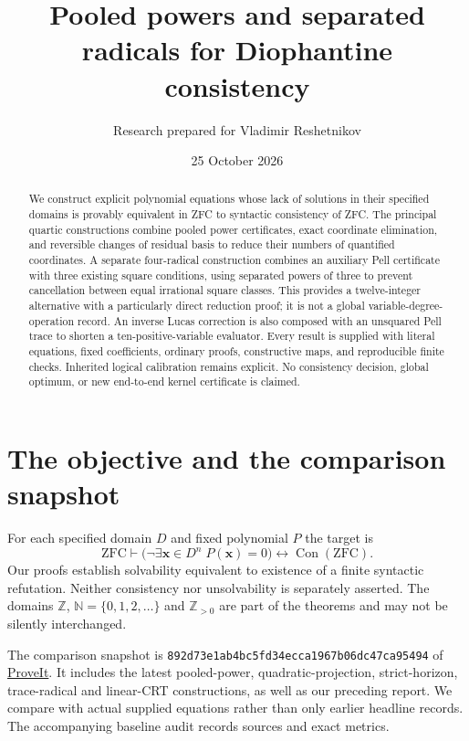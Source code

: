 \documentclass[11pt]{article}
\title{Pooled powers and separated radicals for Diophantine consistency}
\author{Research prepared for Vladimir Reshetnikov}
\date{25 October 2026}
\theoremstyle{definition}\newtheorem{definition}[theorem]{Definition}
\theoremstyle{remark}\newtheorem{remark}[theorem]{Remark}
\newcommand{\Z}{\mathbb Z}\newcommand{\N}{\mathbb N}
\newcommand{\Con}{\operatorname{Con}}
\begin{document}
\maketitle
\begin{abstract}
We construct explicit polynomial equations whose lack of solutions in their
specified domains is provably equivalent in ZFC to syntactic consistency
of ZFC. The principal quartic constructions combine pooled power certificates,
exact coordinate elimination, and reversible changes of residual basis
to reduce their numbers of quantified coordinates.
A separate four-radical construction combines an auxiliary Pell certificate
with three existing square conditions, using separated powers of three
to prevent cancellation between equal irrational square classes. This
provides a twelve-integer alternative with a particularly direct reduction
proof; it is not a global variable-degree-operation record.
An inverse Lucas correction is also composed with an unsquared Pell trace
to shorten a ten-positive-variable evaluator.
Every result is supplied with literal equations, fixed coefficients,
ordinary proofs, constructive maps, and reproducible finite checks.
Inherited logical calibration remains explicit. No consistency decision,
global optimum, or new end-to-end kernel certificate is claimed.
\end{abstract}
\tableofcontents
\section{The objective and the comparison snapshot}
For each specified domain $D$ and fixed polynomial $P$ the target is
\[
\mathrm{ZFC}\vdash
\bigl(\neg\exists \boldsymbol{x}\in D^n\;P(\boldsymbol{x})=0\bigr)
\longleftrightarrow\Con(\mathrm{ZFC}).
\]
Our proofs establish solvability equivalent to existence of a finite
syntactic refutation. Neither consistency nor unsolvability is separately
asserted. The domains $\Z$, $\N=\{0,1,2,\ldots\}$ and $\Z_{>0}$ are
part of the theorems and may not be silently interchanged.

The comparison snapshot is
\texttt{892d73e1ab4bc5fd34ecca1967b06dc47ca95494} of
\href{https://github.com/VladimirReshetnikov/ProveIt}{ProveIt}.
It includes the latest pooled-power, quadratic-projection, strict-horizon,
trace-radical and linear-CRT constructions, as well as our preceding report.
We compare with actual supplied equations rather than only earlier headline
records. The accompanying baseline audit records sources and exact metrics.
\end{document}
